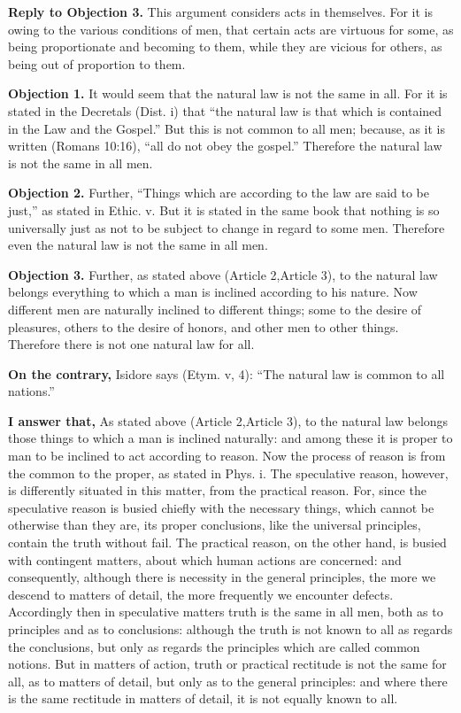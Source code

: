 \textbf{Reply to Objection 3.} This argument considers acts in themselves. For it is owing to the various conditions of men, that certain acts are virtuous for some, as being proportionate and becoming to them, while they are vicious for others, as being out of proportion to them.


\textbf{Objection 1.} It would seem that the natural law is not the same in all. For it is stated in the Decretals (Dist. i) that ``the natural law is that which is contained in the Law and the Gospel.'' But this is not common to all men; because, as it is written (Romans 10:16), ``all do not obey the gospel.'' Therefore the natural law is not the same in all men.

\textbf{Objection 2.} Further, ``Things which are according to the law are said to be just,'' as stated in Ethic. v. But it is stated in the same book that nothing is so universally just as not to be subject to change in regard to some men. Therefore even the natural law is not the same in all men.

\textbf{Objection 3.} Further, as stated above (Article 2,Article 3), to the natural law belongs everything to which a man is inclined according to his nature. Now different men are naturally inclined to different things; some to the desire of pleasures, others to the desire of honors, and other men to other things. Therefore there is not one natural law for all.

\textbf{On the contrary,} Isidore says (Etym. v, 4): ``The natural law is common to all nations.''

\textbf{I answer that,} As stated above (Article 2,Article 3), to the natural law belongs those things to which a man is inclined naturally: and among these it is proper to man to be inclined to act according to reason. Now the process of reason is from the common to the proper, as stated in Phys. i. The speculative reason, however, is differently situated in this matter, from the practical reason. For, since the speculative reason is busied chiefly with the necessary things, which cannot be otherwise than they are, its proper conclusions, like the universal principles, contain the truth without fail. The practical reason, on the other hand, is busied with contingent matters, about which human actions are concerned: and consequently, although there is necessity in the general principles, the more we descend to matters of detail, the more frequently we encounter defects. Accordingly then in speculative matters truth is the same in all men, both as to principles and as to conclusions: although the truth is not known to all as regards the conclusions, but only as regards the principles which are called common notions. But in matters of action, truth or practical rectitude is not the same for all, as to matters of detail, but only as to the general principles: and where there is the same rectitude in matters of detail, it is not equally known to all.

